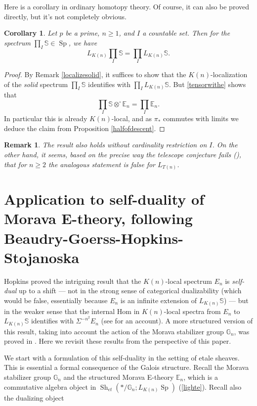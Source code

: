 \documentclass[12pt]{article}
\newtheorem{corollary}[theorem]{Corollary}
\newtheorem{remark}[theorem]{Remark}
\newcommand{\on}{\operatorname}
\newcommand{\mbb}{\mathbb}
\newcommand{\solid}{\square}
\begin{document}
Here is a corollary in ordinary homotopy theory.  Of course, it can also be proved directly, but it's not completely obvious.

\begin{corollary}
Let $p$ be a prime, $n\geq 1$, and $I$ a countable set.  Then for the spectrum $\prod_I \mathbb{S} \in \on{Sp}$, we have
$$L_{K(n)}\prod_I\mathbb{S} = \prod_I L_{K(n)}\mbb{S}.$$
\end{corollary}
\begin{proof}
By Remark \ref{localizesolid}, it suffices to show that the $K(n)$-localization of the \emph{solid} spectrum $\prod_I\mathbb{S}$ identifies with $\prod_I L_{K(n)}\mbb{S}$.  But \ref{tensorwithe} shows that
$$\prod_I\mathbb{S}\otimes^\solid \mbb{E}_n = \prod_I \mbb{E}_n.$$
In particular this is already $K(n)$-local, and as $\pi_\ast$ commutes with limits we deduce the claim from Proposition \ref{halfofdescent}.
\end{proof}

\begin{remark}
The result also holds without cardinality restriction on $I$.  On the other hand, it seems, based on the precise way the telescope conjecture fails (\cite{BurklundTelescope}), that for $n\geq 2$ the analogous statement is false for $L_{T(n)}$.
\end{remark}

\section{Application to self-duality of Morava E-theory, following Beaudry-Goerss-Hopkins-Stojanoska}\label{bghssec}

Hopkins proved the intriguing result that the $K(n)$-local spectrum $E_n$ is \emph{self-dual} up to a shift --- not in the strong sense of categorical dualizability (which would be false, essentially because $E_n$ is an infinite extension of $L_{K(n)}\mathbb{S}$) --- but in the weaker sense that the internal Hom in $K(n)$-local spectra from $E_n$ to $L_{K(n)}\mathbb{S}$ identifies with $\Sigma^{-n^2}E_n$ (see \cite{StricklandDuality} for an account).  A more structured version of this result, taking into account the action of the Morava stabilizer group $\mathbb{G}_n$, was proved in \cite{BeaudryLinearization}.  Here we revisit these results from the perspective of this paper.

We start with a formulation of this self-duality in the setting of etale sheaves.  This is essential a formal consequence of the Galois structure.  Recall the Morava stabilizer group $\mathbb{G}_n$ and the structured Morava E-theory $\mathbb{E}_n$, which is a commutative algebra object in $\on{Sh}_{et}(\ast/\mathbb{G}_n;L_{K(n)}\on{Sp})$ (\ref{lighte}).  Recall also the dualizing object 
\end{document}
